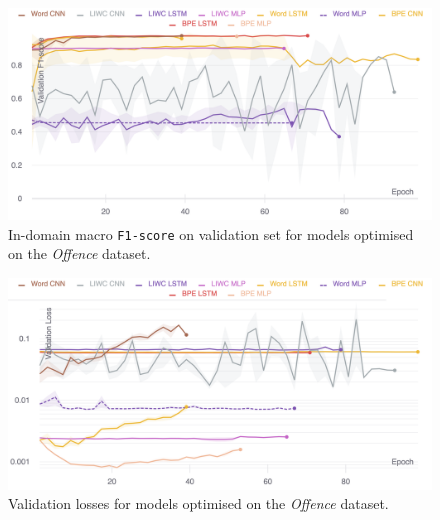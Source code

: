 \begin{figure}  
    \centering  
    \includegraphics[width=\textwidth]{davidson_dev_f1.pdf}  
    \caption{In-domain macro \texttt{F1-score} on validation set for models optimised on the \textit{Offence} dataset.}  
    \label{fig:davidson_dev_f1}  
\end{figure}  
  
\begin{figure}  
    \centering  
    \includegraphics[width=\textwidth]{davidson_dev_loss_stderr_logscale.pdf}  
    \caption{Validation losses for models optimised on the \textit{Offence} dataset.}  
    \label{fig:davidson_dev_loss}  
\end{figure}  
  
